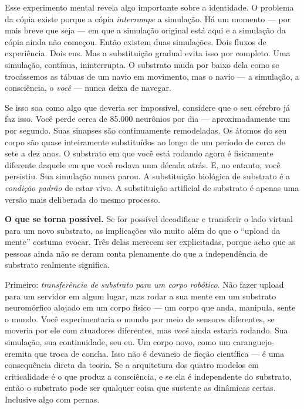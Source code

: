 \documentclass[11pt, twoside, openright]{book}
\begin{document}
Esse experimento mental revela algo importante sobre a identidade. O problema da cópia existe porque a cópia \textit{interrompe} a simulação. Há um momento --- por mais breve que seja --- em que a simulação original está aqui e a simulação da cópia ainda não começou. Então existem duas simulações. Dois fluxos de experiência. Dois eus. Mas a substituição gradual evita isso por completo. Uma simulação, contínua, ininterrupta. O substrato muda por baixo dela como se trocássemos as tábuas de um navio em movimento, mas o navio --- a simulação, a consciência, o \textit{você} --- nunca deixa de navegar.

Se isso soa como algo que deveria ser impossível, considere que o seu cérebro já faz isso. Você perde cerca de 85.000 neurônios por dia --- aproximadamente um por segundo. Suas sinapses são continuamente remodeladas. Os átomos do seu corpo são quase inteiramente substituídos ao longo de um período de cerca de sete a dez anos. O substrato em que você está rodando agora é fisicamente diferente daquele em que você rodava uma década atrás. E, no entanto, você persistiu. Sua simulação nunca parou. A substituição biológica de substrato é a \textit{condição padrão} de estar vivo. A substituição artificial de substrato é apenas uma versão mais deliberada do mesmo processo.

\textbf{O que se torna possível.} Se for possível decodificar e transferir o lado virtual para um novo substrato, as implicações vão muito além do que o ``upload da mente'' costuma evocar. Três delas merecem ser explicitadas, porque acho que as pessoas ainda não se deram conta plenamente do que a independência de substrato realmente significa.

Primeiro: \textit{transferência de substrato para um corpo robótico}. Não fazer upload para um servidor em algum lugar, mas rodar a sua mente em um substrato neuromórfico alojado em um corpo físico --- um corpo que anda, manipula, sente o mundo. Você experimentaria o mundo por meio de sensores diferentes, se moveria por ele com atuadores diferentes, mas \textit{você} ainda estaria rodando. Sua simulação, sua continuidade, seu eu. Um corpo novo, como um caranguejo-eremita que troca de concha. Isso não é devaneio de ficção científica --- é uma consequência direta da teoria. Se a arquitetura dos quatro modelos em criticalidade é o que produz a consciência, e se ela é independente do substrato, então o substrato pode ser qualquer coisa que sustente as dinâmicas certas. Inclusive algo com pernas.
\end{document}
